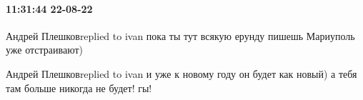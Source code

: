  
 
 
 
 

\paragraph{11:31:44 22-08-22}

Андрей Плешковreplied to ivan
пока ты тут всякую ерунду пишешь Мариуполь уже отстраивают)

Андрей Плешковreplied to ivan
и уже к новому году он будет как новый) а тебя там больше никогда не будет! гы!
